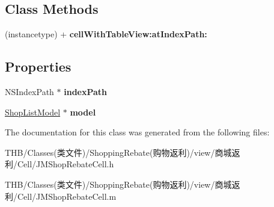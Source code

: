 \subsection*{Class Methods}
\begin{DoxyCompactItemize}
\item 
\mbox{\label{interface_j_m_shop_rebate_cell_a0f3e56b4bc3db042ca623933fec9f166}} 
(instancetype) + {\bfseries cell\+With\+Table\+View\+:at\+Index\+Path\+:}
\end{DoxyCompactItemize}
\subsection*{Properties}
\begin{DoxyCompactItemize}
\item 
\mbox{\label{interface_j_m_shop_rebate_cell_a7765501e7f86237e31367f17fe5c6e4b}} 
N\+S\+Index\+Path $\ast$ {\bfseries index\+Path}
\item 
\mbox{\label{interface_j_m_shop_rebate_cell_a6d302df15cfd9577bcf215d277ce5990}} 
\mbox{\hyperlink{interface_shop_list_model}{Shop\+List\+Model}} $\ast$ {\bfseries model}
\end{DoxyCompactItemize}


The documentation for this class was generated from the following files\+:\begin{DoxyCompactItemize}
\item 
T\+H\+B/\+Classes(类文件)/\+Shopping\+Rebate(购物返利)/view/商城返利/\+Cell/J\+M\+Shop\+Rebate\+Cell.\+h\item 
T\+H\+B/\+Classes(类文件)/\+Shopping\+Rebate(购物返利)/view/商城返利/\+Cell/J\+M\+Shop\+Rebate\+Cell.\+m\end{DoxyCompactItemize}
